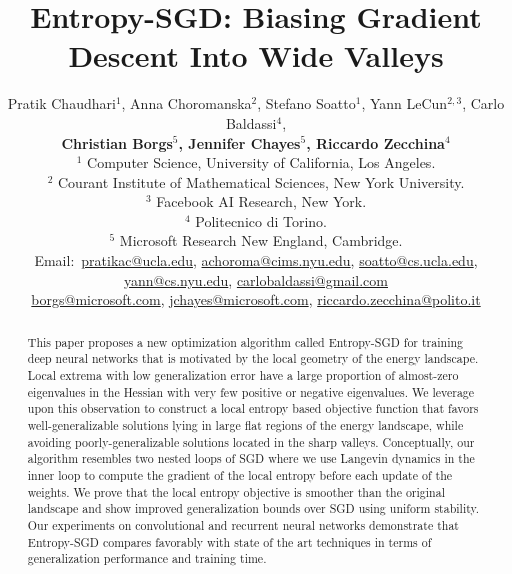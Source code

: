 \documentclass[10pt]{article}
\title{Entropy-SGD: Biasing Gradient Descent Into Wide Valleys}
\author{Pratik Chaudhari$^{1}$, Anna Choromanska$^{2}$, Stefano Soatto$^{1}$, Yann LeCun$^{2,3}$, Carlo Baldassi$^{4}$,\\[0.03in]
\textbf{Christian Borgs$^{5}$, Jennifer Chayes$^{5}$, 
Riccardo Zecchina$^{4}$}\\[0.05in]
$^{1}$ Computer Science, University of California, Los Angeles.\\
$^{2}$ Courant Institute of Mathematical Sciences, New York University.\\
$^{3}$ Facebook AI Research, New York.\\
$^{4}$ Politecnico di Torino.\\
$^{5}$ Microsoft Research New England, Cambridge.\\ [0.05in]
{\footnotesize
Email:\ \href{mailto:pratikac@ucla.edu}{pratikac@ucla.edu},
\href{mailto:achoroma@cims.nyu.edu}{achoroma@cims.nyu.edu},
\href{mailto:soatto@cs.ucla.edu}{soatto@cs.ucla.edu},
\href{mailto:yann@cs.nyu.edu}{yann@cs.nyu.edu},
\href{mailto:carlobaldassi@gmail.com}{carlobaldassi@gmail.com}}\\[0.03in]
{\footnotesize
\hspace{0.33in} \href{mailto:borgs@microsoft.com}{borgs@microsoft.com},
\href{mailto:jchayes@microsoft.com}{jchayes@microsoft.com},
\href{mailto:riccardo.zecchina@polito.it}{riccardo.zecchina@polito.it}
}}
\begin{document}
\maketitle

\begin{abstract}
This paper proposes a new optimization algorithm called Entropy-SGD for training deep neural networks that is motivated by the local geometry of the energy landscape. Local extrema with low generalization error have a large proportion of almost-zero eigenvalues in the Hessian with very few positive or negative eigenvalues. We leverage upon this observation to construct a local entropy based objective function that favors well-generalizable solutions lying in large flat regions of the energy landscape, while avoiding poorly-generalizable solutions located in the sharp valleys. Conceptually, our algorithm resembles two nested loops of SGD where we use Langevin dynamics in the inner loop to compute the gradient of the local entropy before each update of the weights. We prove that the local entropy objective is smoother than the original landscape and show improved generalization bounds over SGD using uniform stability. Our experiments on convolutional and recurrent neural networks demonstrate that Entropy-SGD compares favorably with state of the art techniques in terms of generalization performance and training time.
\end{abstract}
\end{document}

